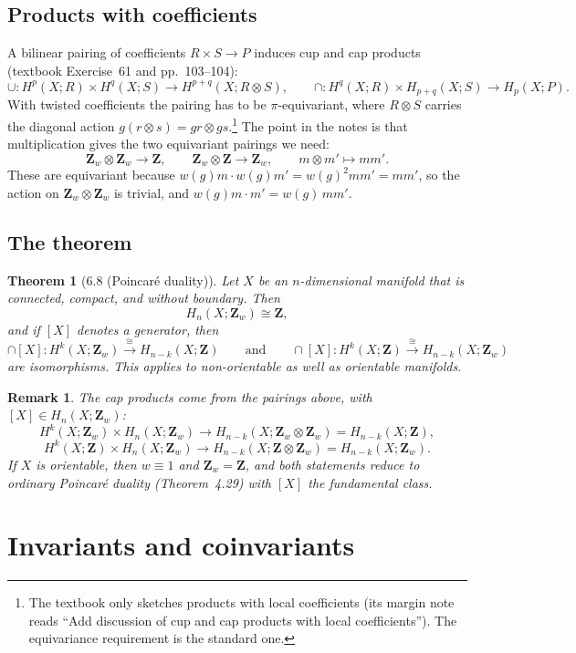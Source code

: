 \documentclass[11pt]{article}
\newcommand{\Z}{\mathbf{Z}}
\newcommand{\iso}{\cong}
\theoremstyle{namedit}
\newtheorem{thm}{Theorem}
\theoremstyle{namedrm}
\newtheorem{rem}{Remark}
\begin{document}
\subsection{Products with coefficients}
A bilinear pairing of coefficients $R\times S\to P$ induces cup and cap products (textbook
Exercise~61 and pp.~103--104):
\[
  \cup\colon H^p(X;R)\times H^q(X;S)\to H^{p+q}(X;R\otimes S),\qquad
  \cap\colon H^q(X;R)\times H_{p+q}(X;S)\to H_p(X;P).
\]
With twisted coefficients the pairing has to be $\pi$-equivariant, where $R\otimes S$ carries the
diagonal action $g(r\otimes s)=gr\otimes gs$.\footnote{The textbook only sketches products with local
coefficients (its margin note reads ``Add discussion of cup and cap products with local
coefficients''). The equivariance requirement is the standard one.}
The point in the notes is that multiplication gives the two equivariant pairings we need:
\[
  \Z_w\otimes\Z_w\to\Z,\qquad \Z_w\otimes\Z\to\Z_w,\qquad m\otimes m'\mapsto mm'.
\]
These are equivariant because $w(g)m\cdot w(g)m'=w(g)^2mm'=mm'$, so the action on $\Z_w\otimes\Z_w$ is
trivial, and $w(g)m\cdot m'=w(g)\,mm'$.

\subsection{The theorem}

\begin{thm}[6.8 (Poincar\'e duality)]
Let $X$ be an $n$-dimensional manifold that is connected, compact, and without boundary. Then
\[
  H_n(X;\Z_w)\iso\Z,
\]
and if $[X]$ denotes a generator, then
\[
  \cap[X]\colon H^k(X;\Z_w)\xrightarrow{\ \iso\ }H_{n-k}(X;\Z)
  \qquad\text{and}\qquad
  \cap[X]\colon H^k(X;\Z)\xrightarrow{\ \iso\ }H_{n-k}(X;\Z_w)
\]
are isomorphisms. This applies to non-orientable as well as orientable manifolds.
\end{thm}

\begin{rem}
The cap products come from the pairings above, with $[X]\in H_n(X;\Z_w)$:
\[
  H^k(X;\Z_w)\times H_n(X;\Z_w)\to H_{n-k}(X;\Z_w\otimes\Z_w)=H_{n-k}(X;\Z),
\]
\[
  H^k(X;\Z)\times H_n(X;\Z_w)\to H_{n-k}(X;\Z\otimes\Z_w)=H_{n-k}(X;\Z_w).
\]
If $X$ is orientable, then $w\equiv1$ and $\Z_w=\Z$, and both statements reduce to ordinary Poincar\'e
duality (Theorem~4.29) with $[X]$ the fundamental class.
\end{rem}

\section{Invariants and coinvariants}
\end{document}
